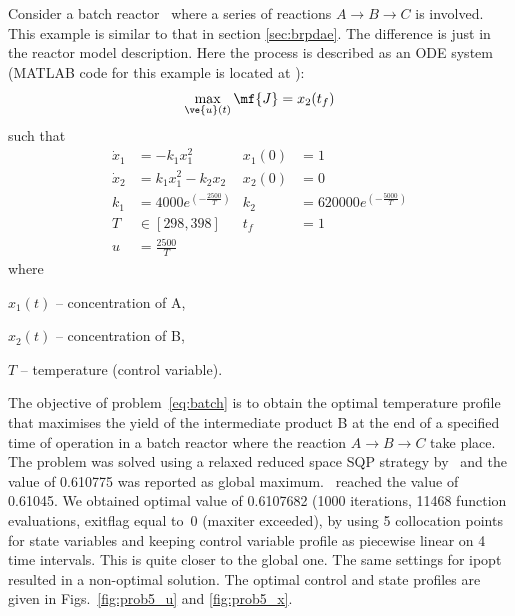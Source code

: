 Consider a batch reactor~\citep{raj01,dad95} where a series of
reactions $A \rightarrow B\rightarrow C$ is involved. This example is
similar to that in section \ref{sec:brpdae}. The difference is just in
the reactor model description. Here the process is described as an ODE
system (MATLAB code for this example is located at
):
\begin{equation}
\max_{\ve{u}(t)} \mf{J} = x_{2}(t_{f}) \label{eq:batch}
\end{equation}
such that
\begin{align*}
\dot{x}_1&=-k_{1}x_{1}^{2} &x_1(0) &= 1 \\
\dot{x}_2&=k_{1}x_{1}^{2}-k_{2}x_{2} &x_2(0) &= 0 \\
k_1 &=4000e^{(-\frac{2500}{T})} &k_2 &=620000e^{(-\frac{5000}{T})} \\
T &\in [298,398] & t_f &=1 \\
u &= \frac{2500}{T}
\end{align*}
where
\begin{description}
\item $x_{1}(t)$ -- concentration of A,
\item $x_{2}(t)$ -- concentration of B,
\item $T$ -- temperature (control variable).
\end{description}

The objective of problem~\eqref{eq:batch} is to obtain the optimal
temperature profile that maximises the yield of the intermediate
product B at the end of a specified time of operation in a batch
reactor where the reaction $A \rightarrow B \rightarrow C$ take
place. The problem was solved using a relaxed reduced space SQP
strategy by~\cite{log89} and the value of 0.610775 was reported as
global maximum.~\citeauthor{raj01} reached the value of 0.61045. We
obtained optimal value of 0.6107682 (1000 iterations, 11468 function
evaluations, exitflag equal to~0 (maxiter exceeded), by using
5 collocation points for state variables and keeping control variable
profile as piecewise linear on 4 time intervals. This is quite closer
to the global one. The same settings for ipopt resulted in
a non-optimal solution. The optimal control
and state profiles are given in Figs.~\ref{fig:prob5_u} and
\ref{fig:prob5_x}.
  
